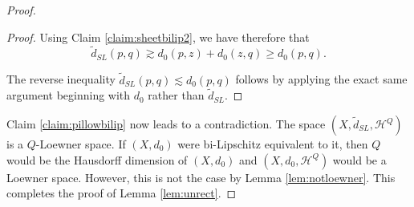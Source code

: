 \documentclass{amsart}
\theoremstyle{plain}
\theoremstyle{definition}
\numberwithin{equation}{section}
\numberwithin{theorem}{section}
\begin{document}
\begin{proof}
\begin{proof}
Using Claim \ref{claim:sheetbilip2}, we have therefore that
$$\tilde{d}_{SL}(p,q) \gtrsim d_0(p,z)+d_0(z,q) \geq d_0(p,q). $$

The reverse inequality $\tilde{d}_{SL}(p,q) \lesssim d_0(p,q)$ follows by applying the exact same argument beginning with $d_0$ rather than $\tilde{d}_{SL}$.
\end{proof}

Claim \ref{claim:pillowbilip} now leads to a contradiction. The space $(X,\tilde{d}_{SL},\mathcal{H}^Q)$ is a $Q$-Loewner space. If $(X,d_0)$ were bi-Lipschitz equivalent to it, then $Q$ would be the Hausdorff dimension of $(X,d_0)$ and $(X,d_0,\mathcal{H}^Q)$ would be a Loewner space. However, this is not the case by Lemma \ref{lem:notloewner}. This completes the proof of Lemma \ref{lem:unrect}.
\end{proof}
\end{document}
